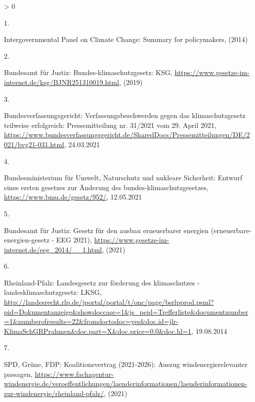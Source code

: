 \documentclass[a4paper,11pt]{article}
\newlength{\cslhangindent}
\newlength{\csllabelwidth}
\newenvironment{CSLReferences}[3] %
 {%
  \setlength{\parindent}{0pt}
  \ifodd #1 \everypar{\setlength{\hangindent}{\cslhangindent}}\ignorespaces\fi
  \ifnum #2 > 0
  \setlength{\parskip}{#2\baselineskip}
  \fi
 }%
 {}
\newcommand{\CSLLeftMargin}[1]{\parbox[t]{\maxof{\widthof{#1}}{\csllabelwidth}}{#1}}
\newcommand{\CSLRightInline}[1]{\parbox[t]{\linewidth}{#1}}
\begin{document}
\noindent

\setlength{\parindent}{-0.5cm}
\setlength{\leftskip}{0.5cm}
\setlength{\parskip}{8pt}

\hypertarget{refs}{}
\begin{CSLReferences}{0}{0}
\leavevmode\hypertarget{ref-IntergovernmentalPanelonClimateChange.2014}{}%
\CSLLeftMargin{1. }
\CSLRightInline{Intergovernmental Panel on Climate Change: Summary for policymakers, (2014)}

\leavevmode\hypertarget{ref-BundesamtfurJustiz.2019}{}%
\CSLLeftMargin{2. }
\CSLRightInline{Bundesamt für Justiz: Bundes-klimaschutzgesetz: KSG, \url{https://www.gesetze-im-internet.de/ksg/BJNR251310019.html}, (2019)}

\leavevmode\hypertarget{ref-Bundesverfassungsgericht.24.03.2021}{}%
\CSLLeftMargin{3. }
\CSLRightInline{Bundesverfassungsgericht: Verfassungsbeschwerden gegen das klimaschutzgesetz teilweise erfolgreich: Pressemitteilung nr. 31/2021 vom 29. April 2021, \url{https://www.bundesverfassungsgericht.de/SharedDocs/Pressemitteilungen/DE/2021/bvg21-031.html}, 24.03.2021}

\leavevmode\hypertarget{ref-BundesministeriumfurUmweltNaturschutzundnukleareSicherheit.12.05.2021}{}%
\CSLLeftMargin{4. }
\CSLRightInline{Bundesministerium für Umwelt, Naturschutz und nukleare Sicherheit: Entwurf eines ersten gesetzes zur {Ä}nderung des bundes-klimaschutzgesetzes, \url{https://www.bmu.de/gesetz/952/}, 12.05.2021}

\leavevmode\hypertarget{ref-BundesamtfurJustiz.2021}{}%
\CSLLeftMargin{5. }
\CSLRightInline{Bundesamt für Justiz: Gesetz f{ü}r den ausbau erneuerbarer energien (erneuerbare-energien-gesetz - EEG 2021), \url{https://www.gesetze-im-internet.de/eeg_2014/__1.html}, (2021)}

\leavevmode\hypertarget{ref-RheinlandPfalz.19.08.2014}{}%
\CSLLeftMargin{6. }
\CSLRightInline{Rheinland-Pfalz: Landesgesetz zur f{ö}rderung des klimaschutzes - landesklimaschutzgesetz: LKSG, \url{http://landesrecht.rlp.de/jportal/portal/t/onc/page/bsrlpprod.psml?pid=Dokumentanzeige\&showdoccase=1\&js_peid=Trefferliste\&documentnumber=1\&numberofresults=22\&fromdoctodoc=yes\&doc.id=jlr-KlimaSchGRPrahmen\&doc.part=X\&doc.price=0.0\&doc.hl=1}, 19.08.2014}

\leavevmode\hypertarget{ref-SPDGruneFDP.2021}{}%
\CSLLeftMargin{7. }
\CSLRightInline{SPD, Grüne, FDP: Koalitionsvertrag (2021-2026): Auszug windenergierelevanter passagen, \url{https://www.fachagentur-windenergie.de/veroeffentlichungen/laenderinformationen/laenderinformationen-zur-windenergie/rheinland-pfalz/}, (2021)}


\end{CSLReferences}
\end{document}
